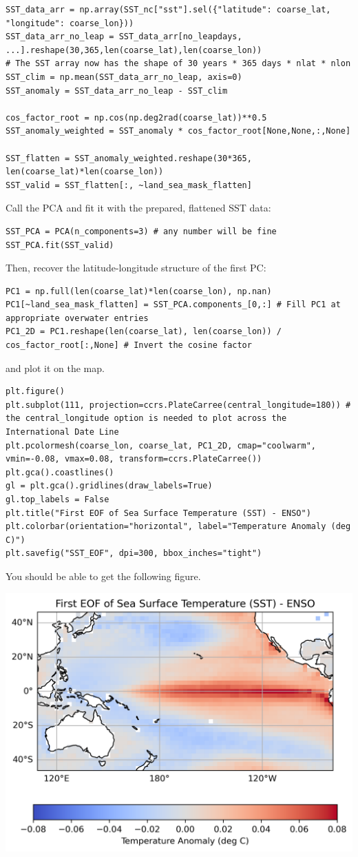 \begin{lstlisting}
SST_data_arr = np.array(SST_nc["sst"].sel({"latitude": coarse_lat, "longitude": coarse_lon}))
SST_data_arr_no_leap = SST_data_arr[no_leapdays, ...].reshape(30,365,len(coarse_lat),len(coarse_lon))
# The SST array now has the shape of 30 years * 365 days * nlat * nlon
SST_clim = np.mean(SST_data_arr_no_leap, axis=0)
SST_anomaly = SST_data_arr_no_leap - SST_clim

cos_factor_root = np.cos(np.deg2rad(coarse_lat))**0.5
SST_anomaly_weighted = SST_anomaly * cos_factor_root[None,None,:,None]

SST_flatten = SST_anomaly_weighted.reshape(30*365, len(coarse_lat)*len(coarse_lon))
SST_valid = SST_flatten[:, ~land_sea_mask_flatten]
\end{lstlisting}
Call the PCA and fit it with the prepared, flattened SST data:
\begin{lstlisting}
SST_PCA = PCA(n_components=3) # any number will be fine
SST_PCA.fit(SST_valid)
\end{lstlisting}
Then, recover the latitude-longitude structure of the first PC:
\begin{lstlisting}
PC1 = np.full(len(coarse_lat)*len(coarse_lon), np.nan)
PC1[~land_sea_mask_flatten] = SST_PCA.components_[0,:] # Fill PC1 at appropriate overwater entries
PC1_2D = PC1.reshape(len(coarse_lat), len(coarse_lon)) / cos_factor_root[:,None] # Invert the cosine factor
\end{lstlisting}
and plot it on the map.
\begin{lstlisting}
plt.figure()
plt.subplot(111, projection=ccrs.PlateCarree(central_longitude=180)) # the central_longitude option is needed to plot across the International Date Line
plt.pcolormesh(coarse_lon, coarse_lat, PC1_2D, cmap="coolwarm", vmin=-0.08, vmax=0.08, transform=ccrs.PlateCarree())
plt.gca().coastlines()
gl = plt.gca().gridlines(draw_labels=True)
gl.top_labels = False
plt.title("First EOF of Sea Surface Temperature (SST) - ENSO")
plt.colorbar(orientation="horizontal", label="Temperature Anomaly (deg C)")
plt.savefig("SST_EOF", dpi=300, bbox_inches="tight")
\end{lstlisting}
You should be able to get the following figure.
\begin{center}
\includegraphics[scale=0.75]{graphics/SST_EOF.png}
\end{center}
